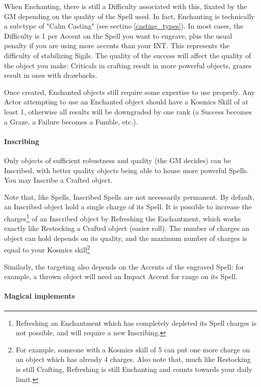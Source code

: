 When Enchanting, there is still a Difficulty associated with this, fixated by the GM depending on the quality of the Spell used. In fact, Enchanting is technically a sub-type of "Calm Casting" (see sectino \ref{casting_types}). In most cases, the Difficulty is 1 per Accent on the Spell you want to engrave, plus the usual penalty if you are using more accents than your INT. This represents the difficulty of stabilizing Sigils. The quality of the success will affect the quality of the object you make: Criticals in crafting result in more powerful objects, grazes result in ones with drawbacks.
	
Once created, Enchanted objects still require some expertise to use properly. Any Actor attempting to use an Enchanted object should have a Kosmics Skill of at least 1, otherwise all results will be downgraded by one rank (a Success becomes a Graze, a Failure becomes a Fumble, etc.).


\paragraph{Inscribing}

Only objects of sufficient robustness and quality (the GM decides) can be Inscribed, with better quality objects being able to house more powerful Spells. You may Inscribe a Crafted object.

Note that, like Spells, Inscribed Spells are not necessarily permanent. By default, an Inscribed object hold a single charge of its Spell. It is possible to increase the charges\footnote{Refreshing an Enchantment which has completely depleted its Spell charges is not possible, and will require a new Inscribing.} of an Inscribed object by Refreshing the Enchantment, which works exactly like Restocking a Crafted object (easier roll). The number of charges an object can hold depends on its quality, and the maximum number of charges is equal to your Kosmics skill\footnote{For example, someone with a Kosmics skill of 5 can put one more charge on an object which has already 4 charges. Also note that, much like Restocking is still Crafting, Refreshing is still Enchanting and counts towards your daily limit.}

Similarly, the targeting also depends on the Accents of the engraved Spell: for example, a thrown object will need an Impact Accent for range on its Spell.

\paragraph{Magical implements}

